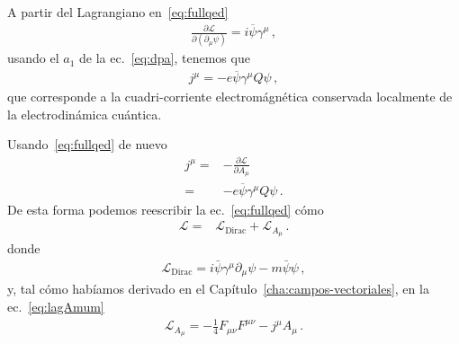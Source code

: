 \begin{frame}
A partir del Lagrangiano en~\eqref{eq:fullqed}
\begin{align}
\frac{\partial\mathcal{L}}{\partial\left(\partial_\mu\psi\right)}=i\overline{\psi}\gamma^{\mu}\,,
\end{align}
usando el $a_1$ de la ec.~\eqref{eq:dpa}, tenemos que
\begin{align}
  j^{\mu}=-e\overline{\psi}\gamma^{\mu} Q \psi\,,
\end{align}
que corresponde a la cuadri-corriente electromágnética conservada localmente de la electrodinámica cuántica.

Usando~\eqref{eq:fullqed} de nuevo
\begin{align}
  \label{eq:jmu}
  j^{\mu}=&-\frac{\partial \mathcal{L}}{\partial A_{\mu}} \nonumber\\
      =&-e\overline{\psi}\gamma^{\mu} Q \psi\,.
\end{align}
De esta forma podemos reescribir la ec.~\eqref{eq:fullqed} cómo
\begin{align}
  \mathcal{L}=&\mathcal{L}_{\text{Dirac}}+\mathcal{L}_{A_{\mu}}\,.
\end{align}
donde
\begin{align}
  \mathcal{L}_{\text{Dirac}}=i\bar{\psi}\gamma^\mu\partial_\mu\psi-m \bar{\psi} \psi\,,
\end{align}
y, tal cómo habíamos derivado en el Capítulo~\ref{cha:campos-vectoriales}, en la ec.~\eqref{eq:lagAmum}
\begin{align}
  \mathcal{L}_{A_{\mu}}=
-\frac{1}{4}F_{\mu\nu}F^{\mu\nu}-j^{\mu}A_\mu\,.
\end{align}


\end{frame}
